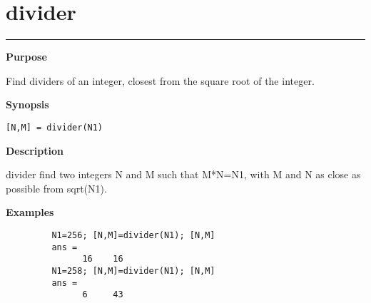 


\section*{\hspace*{-1.6cm} divider}

\vspace*{-.4cm}
\hspace*{-1.6cm}\rule[0in]{16.5cm}{.02cm}
\vspace*{.2cm}



{\bf \large \sf Purpose}\\
\hspace*{1.5cm}
\begin{minipage}[t]{13.5cm}
Find dividers of an integer, closest from the square root of the integer.
\end{minipage}
\vspace*{.5cm}


{\bf \large \sf Synopsis}\\
\hspace*{1.5cm}
\begin{minipage}[t]{13.5cm}
\begin{verbatim}
[N,M] = divider(N1)
\end{verbatim}
\end{minipage}
\vspace*{.5cm}


{\bf \large \sf Description}\\
\hspace*{1.5cm}
\begin{minipage}[t]{13.5cm}
        {\ty divider} find two integers {\ty N} and {\ty M} such that {\ty
        M*N=N1}, with {\ty M} and {\ty N} as close as possible from {\ty
        sqrt(N1)}.\\
\end{minipage}
\vspace*{.5cm}


{\bf \large \sf Examples}
\begin{verbatim}
         N1=256; [N,M]=divider(N1); [N,M]
         ans = 
               16    16 
         N1=258; [N,M]=divider(N1); [N,M]
         ans = 
               6     43 
\end{verbatim}



